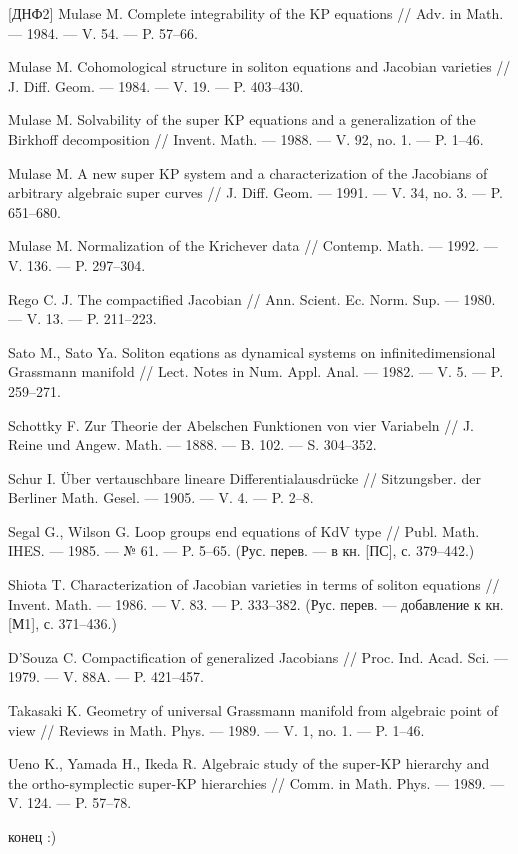 \documentclass{article}
\theoremstyle{definition}
\theoremstyle{definition} %
\theoremstyle{remark}     %
\theoremstyle{definition}
\theoremstyle{definition}
\theoremstyle{definition}
\theoremstyle{definition}
\theoremstyle{definition}
\theoremstyle{definition}
\theoremstyle{definition}
\theoremstyle{definition}
\begin{document}
\begin{thebibliography}{[ДНФ2]}
 Mulase M. Complete integrability of the KP equations // Adv. in Math. --- 1984. --- V. 54. --- P. 57--66.

 Mulase M. Cohomological structure in soliton equations and Jacobian varieties // J. Diff. Geom. --- 1984. --- V. 19. --- P. 403--430.

 Mulase M. Solvability of the super KP equations and a generalization of the Birkhoff decomposition // Invent. Math. --- 1988. --- V. 92, no. 1. --- P. 1--46.

 Mulase M. A new super KP system and a characterization of the Jacobians of arbitrary algebraic super curves // J. Diff. Geom. --- 1991. --- V. 34, no. 3. --- P. 651--680.

 Mulase M. Normalization of the Krichever data // Contemp. Math. --- 1992. --- V. 136. --- P. 297--304.

 Rego C. J. The compactified Jacobian // Ann. Scient. Ec. Norm. Sup. --- 1980. --- V. 13. --- P. 211--223.

 Sato M., Sato Ya. Soliton eqations as dynamical systems on infinitedimensional Grassmann manifold // Lect. Notes in Num. Appl. Anal. --- 1982. --- V. 5. --- P. 259--271.

 Schottky F. Zur Theorie der Abelschen Funktionen von vier Variabeln // J. Reine und Angew. Math. --- 1888. --- B. 102. --- S. 304--352.

 Schur I. Über vertauschbare lineare Differentialausdrücke // Sitzungsber. der Berliner Math. Gesel. --- 1905. --- V. 4. --- P. 2–8.

 Segal G., Wilson G. Loop groups end equations of KdV type // Publ. Math. IHES. --- 1985. --- № 61. --- P. 5–65. (Рус. перев. --- в кн. [ПС], с. 379--442.)

 Shiota T. Characterization of Jacobian varieties in terms of soliton equations // Invent. Math. --- 1986. --- V. 83. --- P. 333--382. (Рус. перев. --- добавление к кн. [М1], с. 371--436.)

 D'Souza C. Compactification of generalized Jacobians // Proc. Ind. Acad. Sci. --- 1979. --- V. 88A. --- P. 421--457.

 Takasaki K. Geometry of universal Grassmann manifold from algebraic point of view // Reviews in Math. Phys. --- 1989. --- V. 1, no. 1. --- P. 1--46.

 Ueno K., Yamada H., Ikeda R. Algebraic study of the super-KP hierarchy and the ortho-symplectic super-KP hierarchies // Comm. in Math. Phys. --- 1989. --- V. 124. --- P. 57--78.

\end{thebibliography}


\vfill

конец :)
\end{document}
